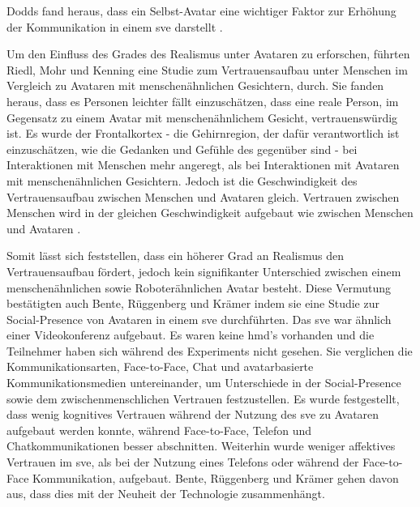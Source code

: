 \documentclass[a4paper,11pt]{article}%
\renewcommand{\\}{\vspace*{0.5\baselineskip} \newline}
\begin{document}
Dodds fand heraus, dass ein Selbst-Avatar eine wichtiger Faktor zur Erhöhung der Kommunikation in einem \ac{sve} darstellt \citep[1-11]{dodds2011talk}.

Um den Einfluss des Grades des Realismus unter Avataren zu erforschen, führten Riedl, Mohr und Kenning \cite{riedl2014trusting} eine Studie zum Vertrauensaufbau unter Menschen im Vergleich zu Avataren mit menschenähnlichen Gesichtern, durch. Sie fanden heraus, dass es Personen leichter fällt einzuschätzen, dass eine reale Person, im Gegensatz zu einem Avatar mit menschenähnlichem Gesicht, vertrauenswürdig ist. Es wurde der Frontalkortex - die Gehirnregion, der dafür verantwortlich ist einzuschätzen, wie die Gedanken und Gefühle des gegenüber sind - bei Interaktionen mit Menschen mehr angeregt, als bei Interaktionen mit Avataren mit menschenähnlichen Gesichtern.
Jedoch ist die Geschwindigkeit des Vertrauensaufbau zwischen Menschen und Avataren gleich. Vertrauen zwischen Menschen wird in der gleichen Geschwindigkeit aufgebaut wie zwischen Menschen und Avataren \cite{riedl2014trusting}.

Somit lässt sich feststellen, dass ein höherer Grad an Realismus den Vertrauensaufbau fördert, jedoch kein signifikanter Unterschied zwischen einem menschenähnlichen sowie Roboterähnlichen Avatar besteht. Diese Vermutung bestätigten auch Bente, Rüggenberg und Krämer \citep[p.54-59]{bente2004social} indem sie eine Studie zur Social-Presence von Avataren in einem \ac{sve} durchführten. Das \ac{sve} war ähnlich einer Videokonferenz aufgebaut. Es waren keine \ac{hmd}'s vorhanden und die Teilnehmer haben sich während des Experiments nicht gesehen. Sie verglichen die Kommunikationsarten, Face-to-Face, Chat und avatarbasierte Kommunikationsmedien untereinander, um Unterschiede in der Social-Presence sowie dem zwischenmenschlichen Vertrauen festzustellen.
Es wurde festgestellt, dass wenig kognitives Vertrauen während der Nutzung des \ac{sve} zu Avataren aufgebaut werden konnte, während Face-to-Face, Telefon und Chatkommunikationen besser abschnitten. Weiterhin wurde weniger affektives Vertrauen im \ac{sve}, als bei der Nutzung eines Telefons oder während der Face-to-Face Kommunikation, aufgebaut.
Bente, Rüggenberg und Krämer \citep[p.54-59]{bente2004social} gehen davon aus, dass dies mit der Neuheit der Technologie zusammenhängt.
\end{document}
